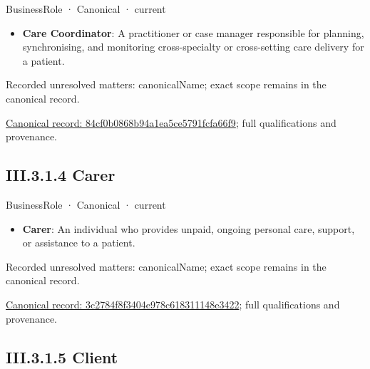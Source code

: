 \label{element:84cf0b0868b94a1ea5ce5791fcfa66f9}
{\small BusinessRole · Canonical · current}\par

\begin{itemize}


\item \textbf{Care Coordinator}: A practitioner or case manager responsible for planning, synchronising, and monitoring cross-specialty or cross-setting care delivery for a patient.

\end{itemize}

{\small Recorded unresolved matters: canonicalName; exact scope remains in the canonical record.}\par
{\footnotesize \href{../../../../../../../continuum/business/business-role/84cf0b0868b94a1ea5ce5791fcfa66f9.md}{Canonical record: 84cf0b0868b94a1ea5ce5791fcfa66f9}; full qualifications and provenance.}\par
\subsection*{III.3.1.4 Carer}
\label{navigation:III.3.1.4}

\label{element:3c2784f8f3404e978c618311148e3422}
{\small BusinessRole · Canonical · current}\par

\begin{itemize}


\item \textbf{Carer}: An individual who provides unpaid, ongoing personal care, support, or assistance to a patient.

\end{itemize}

{\small Recorded unresolved matters: canonicalName; exact scope remains in the canonical record.}\par
{\footnotesize \href{../../../../../../../continuum/business/business-role/3c2784f8f3404e978c618311148e3422.md}{Canonical record: 3c2784f8f3404e978c618311148e3422}; full qualifications and provenance.}\par
\subsection*{III.3.1.5 Client}
\label{navigation:III.3.1.5}

